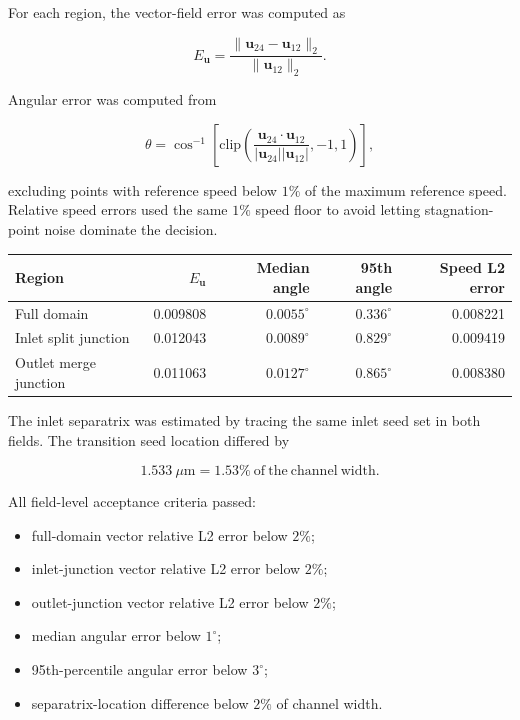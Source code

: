 For each region, the vector-field error was computed as

\[
E_{\mathbf{u}}
=
\frac{\|\mathbf{u}_{24}-\mathbf{u}_{12}\|_2}
     {\|\mathbf{u}_{12}\|_2}.
\]

Angular error was computed from

\[
\theta =
\cos^{-1}
\left[
\mathrm{clip}
\left(
\frac{\mathbf{u}_{24}\cdot\mathbf{u}_{12}}
     {|\mathbf{u}_{24}||\mathbf{u}_{12}|},
-1,1
\right)
\right],
\]

excluding points with reference speed below \(1\%\) of the maximum reference
speed.  Relative speed errors used the same \(1\%\) speed floor to avoid
letting stagnation-point noise dominate the decision.

\begin{center}
\begin{tabular}{lrrrr}
\toprule
Region & \(E_{\mathbf{u}}\) & Median angle & 95th angle & Speed L2 error \\
\midrule
Full domain & 0.009808 & \(0.0055^\circ\) & \(0.336^\circ\) & 0.008221 \\
Inlet split junction & 0.012043 & \(0.0089^\circ\) & \(0.829^\circ\) & 0.009419 \\
Outlet merge junction & 0.011063 & \(0.0127^\circ\) & \(0.865^\circ\) & 0.008380 \\
\bottomrule
\end{tabular}
\end{center}

The inlet separatrix was estimated by tracing the same inlet seed set in both
fields.  The transition seed location differed by

\[
1.533~\mu\mathrm{m}
= 1.53\%~\mathrm{of~the~channel~width}.
\]

All field-level acceptance criteria passed:

\begin{itemize}
  \item full-domain vector relative L2 error below \(2\%\);
  \item inlet-junction vector relative L2 error below \(2\%\);
  \item outlet-junction vector relative L2 error below \(2\%\);
  \item median angular error below \(1^\circ\);
  \item 95th-percentile angular error below \(3^\circ\);
  \item separatrix-location difference below \(2\%\) of channel width.
\end{itemize}

